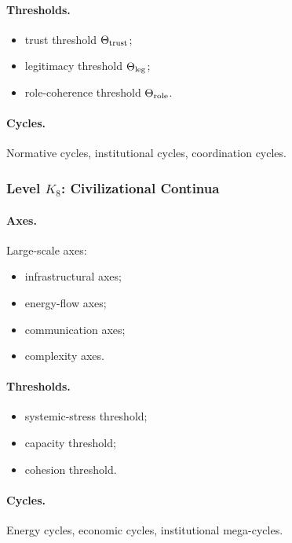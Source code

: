 \paragraph{Thresholds.}
\begin{itemize}
    \item trust threshold \(\Theta_{\rm trust}\);
    \item legitimacy threshold \(\Theta_{\rm leg}\);
    \item role-coherence threshold \(\Theta_{\rm role}\).
\end{itemize}

\paragraph{Cycles.}
Normative cycles, institutional cycles, coordination cycles.

\subsubsection{Level \texorpdfstring{\(K_8\)}{K8}: Civilizational Continua}

\paragraph{Axes.}
Large-scale axes:
\begin{itemize}
    \item infrastructural axes;
    \item energy-flow axes;
    \item communication axes;
    \item complexity axes.
\end{itemize}

\paragraph{Thresholds.}
\begin{itemize}
    \item systemic-stress threshold;
    \item capacity threshold;
    \item cohesion threshold.
\end{itemize}

\paragraph{Cycles.}
Energy cycles, economic cycles, institutional mega-cycles.



